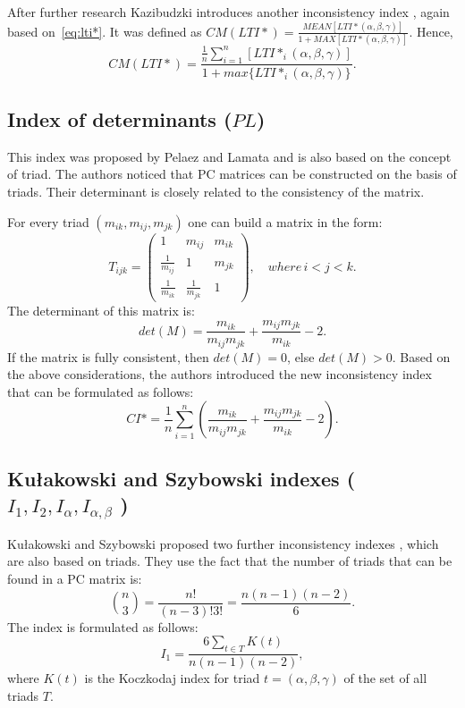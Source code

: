After further research Kazibudzki introduces another inconsistency index \cite{Kazibudzki2017}, again based on~\ref{eq:lti*}. It was defined as $CM(LTI*)=\frac{MEAN[LTI*(\alpha,\beta,\gamma)]}{1+MAX[LTI*(\alpha,\beta,\gamma)]}$. Hence,
	\begin{equation} 
		CM(LTI*)=\frac{\frac{1}{n}\sum_{i=1}^{n}[LTI*_{i}(\alpha,\beta,\gamma)]}{1+max\{LTI*_{i}(\alpha,\beta,\gamma)\}}.
	 \end{equation}
 

\subsection{Index of determinants ($PL$)}

This index was proposed by Pelaez and Lamata \cite{PELAEZ2003} and is also based on the concept of triad. The authors noticed that PC  matrices can be constructed on the basis of triads. Their determinant is closely related to the consistency of the matrix.

For every triad $(m_{ik},m_{ij},m_{jk})$ one can build a matrix in the form: 
	\begin{equation} 
		T_{ijk}=\left(\begin{array}{ccc}
			1 & m_{ij} & m_{ik}\\
			\frac{1}{m_{ij}} & 1 & m_{jk}\\
			\frac{1}{m_{ik}} & \frac{1}{m_{jk}} & 1
		\end{array}\right),\,\,\,\,\,\,where\,i<j<k.
	\end{equation}
 The determinant of this matrix is:
	\begin{equation} 
		det(M)=\frac{m_{ik}}{m_{ij}m_{jk}}+\frac{m_{ij}m_{jk}}{m_{ik}}-2.
	 \end{equation}
 If the matrix is fully consistent, then $det(M)=0$, else $det(M)>0$. Based on the above considerations, the authors introduced the new inconsistency index that can be formulated as follows:
 	\begin{equation} 
		CI*=\frac{1}{n}\sum_{i=1}^{n}\left(\frac{m_{ik}}{m_{ij}m_{jk}}+\frac{m_{ij}m_{jk}}{m_{ik}}-2\right).
	 \end{equation}
 

\subsection{Kułakowski and Szybowski indexes ($I_1, I_2, I_{\alpha}, I_{\alpha,\beta}$ ) }

Kułakowski and Szybowski proposed two further inconsistency indexes \cite{KULAKOWSKI20141}, which are also based on triads. They use the fact that the number of triads that can be found in a PC matrix is:
	\begin{equation} 
		\label{eq:nPo3}
		\binom{n}{3}=\frac{n!}{(n-3)!3!}=\frac{n(n-1)(n-2)}{6}.
	 \end{equation}
 The index is formulated as follows:
	 \begin{equation} 
	 \label{eq:I1}		
		I_{1}=\frac{6\sum_{t\in T}K(t)}{n(n-1)(n-2)},
	 \end{equation}
 where $K(t)$ is the Koczkodaj index for triad $t=(\alpha,\beta,\gamma)$ of the set of all triads $T$. 

